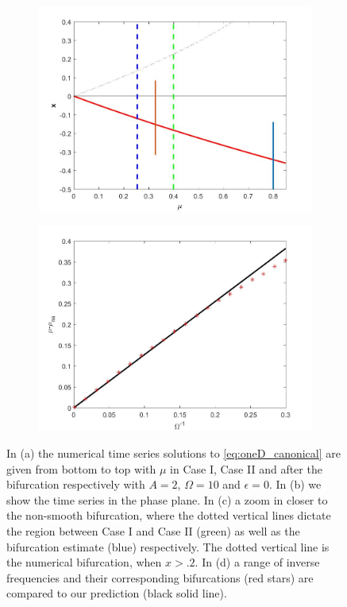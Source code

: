 \begin{figure}[H]
\begin{subfigure}{.5\textwidth}
  \includegraphics[width=\linewidth]{oneD/osc_bif_diagram_zoom.jpg}
  \caption{}
\end{subfigure}%
\begin{subfigure}{.5\textwidth}
\centering
\includegraphics[width=\linewidth]{oneD/osc_Omegacomp.jpg}
\caption{}
\label{fig:oneD_osc_comp}
\end{subfigure}
\caption{In (a) the numerical time series solutions to \eqref{eq:oneD_canonical} are given from bottom to top with $\mu$ in Case I, Case II and after the bifurcation respectively with $A=2$, $\Omega=10$ and $\epsilon=0$. In (b) we show the time series in the phase plane. In (c) a zoom in closer to the non-smooth bifurcation, where the dotted vertical lines dictate the region between Case I and Case II (green) as well as the bifurcation estimate (blue) respectively. The dotted vertical line is the numerical bifurcation, when $x>.2$. In (d) a range of inverse frequencies and their corresponding bifurcations (red stars) are compared to our prediction (black solid line).}
\label{fig:oneD_osc_numerics}
\end{figure}

